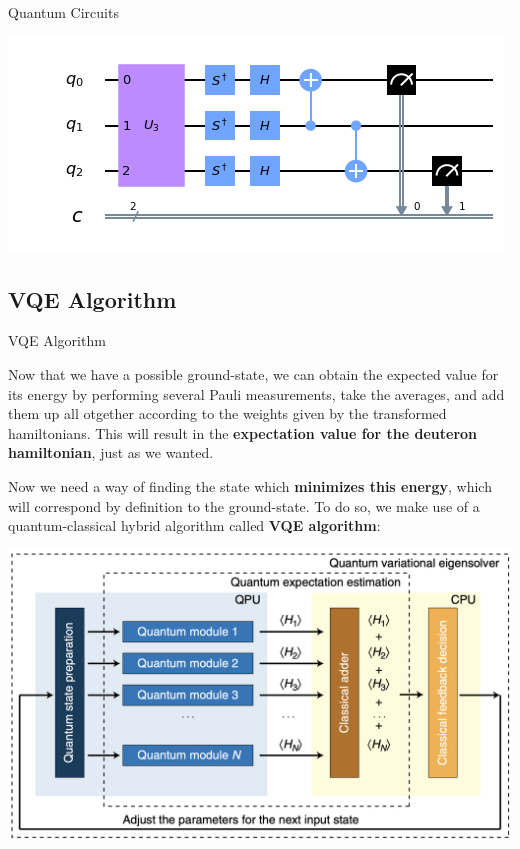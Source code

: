\documentclass[9pt, handout, aspectratio=169]{beamer}		%
\begin{document}
\begin{frame}{Quantum Circuits}
\begin{multicols}{2}
			\columnbreak

			\begin{center}
				\includegraphics[height=.24\paperheight]{Figures/u3_measure}
			\end{center}

		\end{multicols}

	\end{frame}


	\subsection{VQE Algorithm}

	\begin{frame}{VQE Algorithm}

		Now that we have a possible ground-state, we can obtain the expected value for its energy by performing several Pauli measurements, take the averages, and add them up all otgether according to the weights given by the transformed hamiltonians. This will result in the \textbf{expectation value for the deuteron hamiltonian}, just as we wanted.

		\medskip

		Now we need a way of finding the state which \textbf{minimizes this energy}, which will correspond by definition to the ground-state. To do so, we make use of a quantum-classical hybrid algorithm called \textbf{VQE algorithm}:

		\begin{center}
			\includegraphics[height=.44\paperheight]{Figures/vqe_algorithm}
		\end{center}

	\end{frame}
\end{document}
